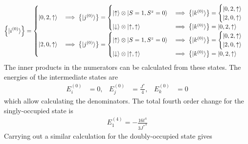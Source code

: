 \documentclass[twoside]{report}
\numberwithin{equation}{section}
\begin{document}
\begin{equation}\begin{aligned}
	\left\{ \ket{i^{(0)}} \right\} = \begin{cases}
		\ket{0, 2, \uparrow} &\implies \left\{ \ket{j^{(0)}}\right\} = \begin{cases}
			\ket{\uparrow}\otimes\ket{S=1,S^z=0} &\implies \left\{\ket{k^{(0)}}\right\} = \begin{cases}
		\ket{0, 2, \uparrow}	\\
		\ket{2, 0, \uparrow}
		\end{cases}\\
				\ket{\downarrow}\otimes\ket{\uparrow,\uparrow} &\implies \left\{\ket{k^{(0)}}\right\} = \ket{0, 2, \uparrow}\\
	\end{cases} \\
			\ket{2, 0, \uparrow}&\implies \left\{ \ket{j^{(0)}}\right\} = \begin{cases}
			\ket{\uparrow}\otimes\ket{S=1,S^z=0} &\implies \left\{\ket{k^{(0)}}\right\} = \begin{cases}
		\ket{0, 2, \uparrow}	\\
		\ket{2, 0, \uparrow}
		\end{cases}\\
				\ket{\downarrow}\otimes\ket{\uparrow,\uparrow} &\implies \left\{\ket{k^{(0)}}\right\} = \ket{0, 2, \uparrow}\\
	\end{cases} \\
	\end{cases}\\
\end{aligned}\end{equation}
The inner products in the numerators can be calculated from these states. The energies of the intermediate states are
\begin{equation}\begin{aligned}
	E^{(0)}_i &=0, &E^{(0)}_j &= \frac{J^*}{4}, &E^{(0)}_k &= 0
\end{aligned}\end{equation}
which allow calculating the denominators. The total fourth order change for the singly-occupied state is
\begin{equation}\begin{aligned}
E_1^{(4)} = -\frac{16t^4}{3{J^*}^3}
\end{aligned}\end{equation}
Carrying out a similar calculation for the doubly-occupied state gives
\end{document}
